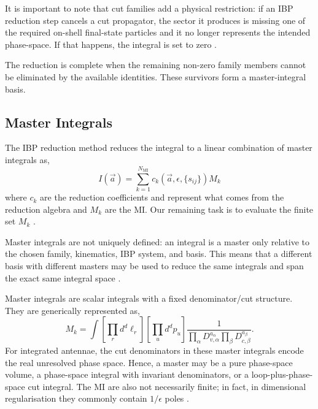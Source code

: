 It is important to note that cut families add a physical restriction: if an IBP 
reduction step cancels a cut propagator, the sector it produces is missing one of 
the required on-shell final-state particles and it no longer represents the 
intended phase-space. If that happens, the integral is set to zero \cite{GehrmannDeRidder0311276}.

The reduction is complete when the remaining non-zero family members cannot be 
eliminated by the available identities. These survivors form a master-integral basis.

\subsection{Master Integrals}\label{subsec:MIs}

The IBP reduction method reduces the integral to a linear combination of master 
integrals as,
\begin{equation}
    I(\vec a) = \sum_{k=1}^{N_\text{MI}}c_k(\vec a,\epsilon,\{s_{ij}\})M_k
\end{equation}
where $c_k$ are the reduction coefficients and represent what 
comes from the reduction algebra and $M_k$ are the MI. Our remaining task is to evaluate 
the finite set $M_k$ \cite{Laporta:2000dsw}.

Master integrals are not uniquely defined: an integral is a master only relative 
to the chosen family, kinematics, IBP system, and basis. This means that a different 
basis 
with different masters may be used to reduce the same integrals and span the exact 
same integral space \cite{Laporta:2000dsw}.

Master integrals are scalar integrals with a fixed denominator/cut structure. They are 
generically represented as,
\begin{equation}
    M_k = \int\left[\prod_{r}d^d\ell_r\right]\left[\prod_u d^d p_u\right]\frac1{\prod_\alpha D_{v,\alpha}^{a_\alpha}\prod_\beta D_{c,\beta}^{a_\beta}}.
\end{equation}
For integrated antennae, the cut denominators in these master integrals encode the 
real unresolved phase space. Hence, a master may be a pure phase-space volume, 
a phase-space integral with invariant denominators, or a loop-plus-phase-space
cut integral. The MI are also not necessarily finite; in fact, in dimensional
regularisation they commonly contain $1/\epsilon$ poles \cite{GehrmannDeRidder0311276}.

